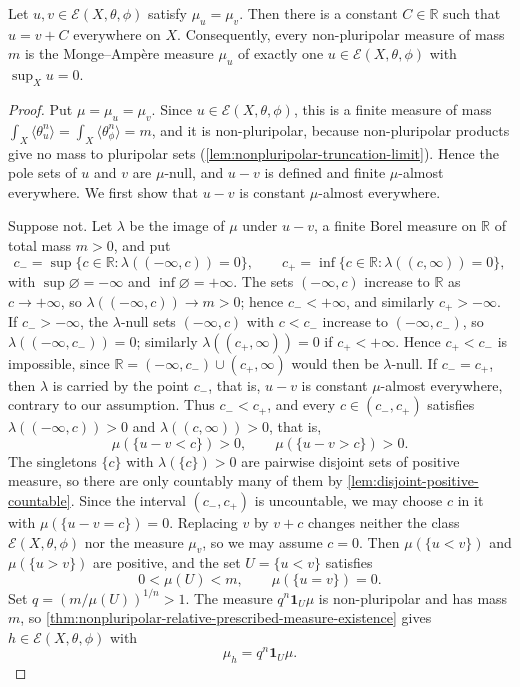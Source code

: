 \begin{theorem}\label{thm:relative-prescribed-measure-uniqueness}
Let $u,v\in\mathcal E(X,\theta,\phi)$ satisfy $\mu_u=\mu_v$. Then there is a constant $C\in\mathbb R$ such that $u=v+C$ everywhere on $X$. Consequently, every non-pluripolar measure of mass $m$ is the Monge--Amp\`ere measure $\mu_u$ of exactly one $u\in\mathcal E(X,\theta,\phi)$ with $\sup_Xu=0$.
\end{theorem}
\begin{proof}
Put $\mu=\mu_u=\mu_v$. Since $u\in\mathcal E(X,\theta,\phi)$, this is a finite measure of mass $\int_X\langle\theta_u^n\rangle=\int_X\langle\theta_\phi^n\rangle=m$, and it is non-pluripolar, because non-pluripolar products give no mass to pluripolar sets (\cref{lem:nonpluripolar-truncation-limit}). Hence the pole sets of $u$ and $v$ are $\mu$-null, and $u-v$ is defined and finite $\mu$-almost everywhere. We first show that $u-v$ is constant $\mu$-almost everywhere.

Suppose not. Let $\lambda$ be the image of $\mu$ under $u-v$, a finite Borel measure on $\mathbb R$ of total mass $m>0$, and put
\[
 c_-=\sup\{c\in\mathbb R:\lambda((-\infty,c))=0\},\qquad
 c_+=\inf\{c\in\mathbb R:\lambda((c,\infty))=0\},
\]
with $\sup\varnothing=-\infty$ and $\inf\varnothing=+\infty$. The sets $(-\infty,c)$ increase to $\mathbb R$ as $c\to+\infty$, so $\lambda((-\infty,c))\to m>0$; hence $c_-<+\infty$, and similarly $c_+>-\infty$. If $c_->-\infty$, the $\lambda$-null sets $(-\infty,c)$ with $c<c_-$ increase to $(-\infty,c_-)$, so $\lambda((-\infty,c_-))=0$; similarly $\lambda((c_+,\infty))=0$ if $c_+<+\infty$. Hence $c_+<c_-$ is impossible, since $\mathbb R=(-\infty,c_-)\cup(c_+,\infty)$ would then be $\lambda$-null. If $c_-=c_+$, then $\lambda$ is carried by the point $c_-$, that is, $u-v$ is constant $\mu$-almost everywhere, contrary to our assumption. Thus $c_-<c_+$, and every $c\in(c_-,c_+)$ satisfies $\lambda((-\infty,c))>0$ and $\lambda((c,\infty))>0$, that is,
\[
 \mu(\{u-v<c\})>0,\qquad\mu(\{u-v>c\})>0.
\]
The singletons $\{c\}$ with $\lambda(\{c\})>0$ are pairwise disjoint sets of positive measure, so there are only countably many of them by \cref{lem:disjoint-positive-countable}. Since the interval $(c_-,c_+)$ is uncountable, we may choose $c$ in it with $\mu(\{u-v=c\})=0$. Replacing $v$ by $v+c$ changes neither the class $\mathcal E(X,\theta,\phi)$ nor the measure $\mu_v$, so we may assume $c=0$. Then $\mu(\{u<v\})$ and $\mu(\{u>v\})$ are positive, and the set $U=\{u<v\}$ satisfies
\[
 0<\mu(U)<m,\qquad\mu(\{u=v\})=0.
\]
Set $q=(m/\mu(U))^{1/n}>1$. The measure $q^n\mathbf1_U\mu$ is non-pluripolar and has mass $m$, so \cref{thm:nonpluripolar-relative-prescribed-measure-existence} gives $h\in\mathcal E(X,\theta,\phi)$ with
\[
 \mu_h=q^n\mathbf1_U\mu.
\]


\end{proof}
